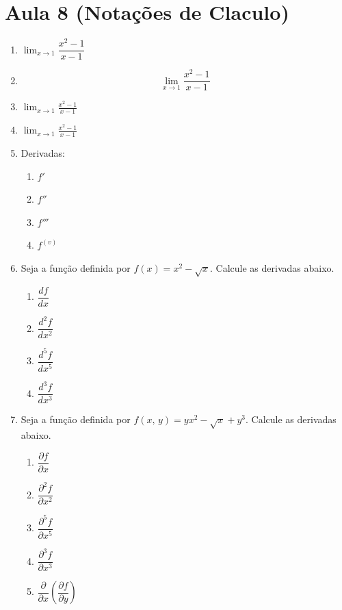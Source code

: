 \documentclass[a4paper,12pt]{article}
\newcommand{\limite}{\displaystyle\lim}
\begin{document}
   \section{Aula 8 (Notações de Claculo)}
   \begin{enumerate}
      \item $\lim_{x \to 1} \dfrac{x^2 - 1}{x - 1}$
       \item $$\lim_{x \to 1} \dfrac{x^2 - 1}{x - 1}$$
      \item $\displaystyle\lim_{x \to 1} \frac{x^2 - 1}{x - 1}$
      \item $\limite_{x \to 1} \frac{x^2 - 1}{x - 1}$
      \item Derivadas:
         \begin{enumerate}
            \item $f'$ \item $f''$ \item $f'''$ \item $f^{(v)}$
         \end{enumerate}
      \item Seja a função definida por $f(x)=x^2 - \sqrt{x}$. Calcule as derivadas abaixo.
      \begin{enumerate}
         \item $\dfrac{df}{dx}$
         \item $\dfrac{d^2f}{dx^2}$
         \item $\dfrac{d^5f}{dx^5}$
         \item $\dfrac{d^3f}{dx^3}$
      \end{enumerate}
      \item Seja a função definida por $f(x, \, y)=yx^2 - \sqrt{x} + y^3$. Calcule as derivadas abaixo.
      \begin{enumerate}
         \item $\dfrac{\partial f}{\partial x}$
         \item $\dfrac{\partial^2f}{\partial x^2}$
         \item $\dfrac{\partial^5f}{\partial x^5}$
         \item $\dfrac{\partial^3f}{\partial x^3}$
         \item $\dfrac{\partial }{\partial x}\left(\dfrac{\partial f}{\partial y} \right)$

\end{enumerate}
\end{enumerate}
\end{document}
